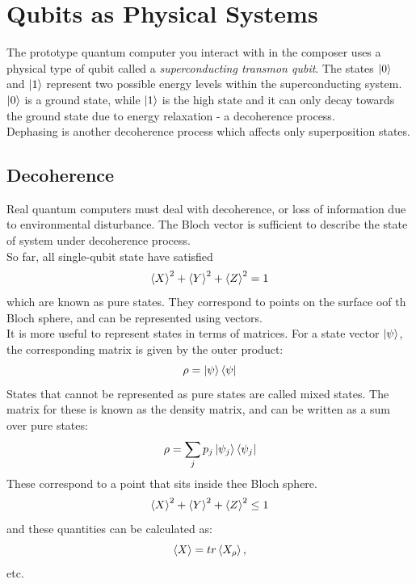 \documentclass[hidelinks, a4paper, 12pt]{article}
\newcommand{\n}{\\[\baselineskip]}
\begin{document}
    \section{Qubits as Physical Systems}
    The prototype quantum computer you interact with in the composer uses a physical type of qubit called a \textit{superconducting transmon qubit}. The states $\ket{0}$ and $\ket{1}$ represent two possible energy levels within
    the superconducting system.\n
    $\ket{0}$ is a ground state, while $\ket{1}$ is the high state and it can only decay towards the ground state due to energy relaxation - a decoherence process.\n
    Dephasing is another decoherence process which affects only superposition states.

        \subsection{Decoherence}
            Real quantum computers must deal with decoherence, or loss of information due to environmental disturbance. The Bloch vector is sufficient to describe the state of system under decoherence process.\n
            So far, all single-qubit state have satisfied
            \[\braket{X}^2 + \braket{Y}^2 + \braket{Z}^2 = 1\]
            which are known as pure states. They correspond to points on the surface oof th Bloch sphere, and can be represented using vectors.\n
            It is more useful to represent states in terms of matrices. For a state vector $\ket{\psi}$, the corresponding matrix is given by the outer product:
            \[\rho = \ket{\psi}\bra{\psi}\]
            States that cannot be represented as pure states are called mixed states. The matrix for these is known as the density matrix, and can be written as a sum over pure states:
            \[\rho = \sum_{j}p_j\ket{\psi_j}\bra{\psi_j}\]
            These correspond to a point that sits inside thee Bloch sphere.
            \[\braket{X}^2 + \braket{Y}^2 + \braket{Z}^2 \leq 1\]
            and these quantities can be calculated as:
            \[\braket{X} = tr\braket{X_\rho},\]
            etc.
    
    
\end{document}
